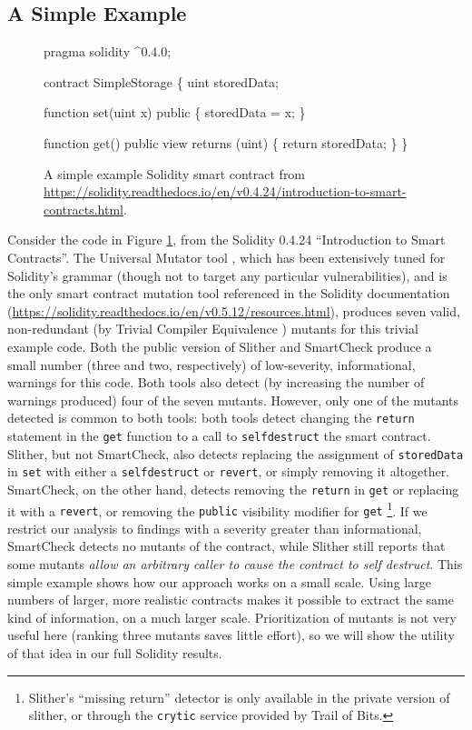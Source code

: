 \subsection{A Simple Example}

\begin{figure}
{\scriptsize
\begin{code}
pragma solidity ^0.4.0;

contract SimpleStorage \{
    uint storedData;

    function set(uint x) public \{
        storedData = x;
    \}

    function get() public view returns (uint) \{
        return storedData;
    \}
  \}
\end{code}
}
\caption{A simple example Solidity smart contract from \url{https://solidity.readthedocs.io/en/v0.4.24/introduction-to-smart-contracts.html}.}
\label{fig:sol424intro}
\end{figure}

Consider the code in Figure \ref{fig:sol424intro}, from the Solidity 0.4.24 ``Introduction to Smart Contracts''.  The Universal Mutator tool \cite{universalmutator,regexpMut}, which has been extensively tuned for Solidity's grammar (though not to target any particular vulnerabilities), and is the only smart contract mutation tool referenced in the Solidity documentation (\url{https://solidity.readthedocs.io/en/v0.5.12/resources.html}), produces seven valid, non-redundant (by Trivial Compiler Equivalence \cite{TCE}) mutants for this trivial example code.  Both the public version of Slither \cite{slither} and SmartCheck \cite{smartcheck} produce a small number (three and two, respectively) of low-severity, informational, warnings for this code.  Both tools also detect (by increasing the number of warnings produced) four of the seven mutants.  However, only one of the mutants detected is common to both tools: both tools detect changing the {\tt return} statement in the {\tt get} function to a call to {\tt selfdestruct} the smart contract.  Slither, but not SmartCheck, also detects replacing the assignment of {\tt storedData} in {\tt set} with either a {\tt selfdestruct} or {\tt revert}, or simply removing it altogether.  SmartCheck, on the other hand, detects removing the {\tt return} in {\tt get} or replacing it with a {\tt revert}, or removing the {\tt public} visibility modifier for {\tt get} \footnote{Slither's ``missing return'' detector is only available in the private version of slither, or through the {\tt crytic} service provided by Trail of Bits.}.  If we restrict our analysis to findings with a severity greater than informational, SmartCheck detects no mutants of the contract, while Slither still reports that some mutants \emph{allow an arbitrary caller to cause the contract to self destruct}.  This simple example shows how our approach works on a small scale.  Using large numbers of larger, more realistic contracts makes it possible to extract the same kind of information, on a much larger scale.  Prioritization of mutants is not very useful here (ranking three mutants saves little effort), so we will show the utility of that idea in our full Solidity results.

